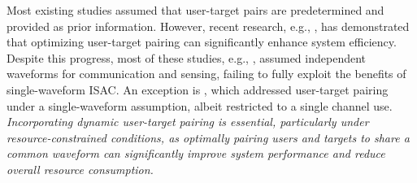 \documentclass[10pt,journal,compsoc]{IEEEtran}
\theoremstyle{myremark}
\theoremstyle{myexample}
\begin{document}
Most existing studies assumed that user-target pairs are predetermined and provided as prior information. However, recent research, e.g., \cite{dou2024:channel-sharing-aided-integrated-sensing-communication-energy-efficient-sensing-scheduling-approach, cazzella2024:deep-learning-based-target-to-user-association-integrated-sensing-communication-systems, abanto2024:optimal-user-target-scheduling-user-target-pairing-low-resolution-phase-only-beamforming-isac-systems}, has demonstrated that optimizing user-target pairing can significantly enhance system efficiency. Despite this progress, most of these studies, e.g., \cite{dou2024:channel-sharing-aided-integrated-sensing-communication-energy-efficient-sensing-scheduling-approach, cazzella2024:deep-learning-based-target-to-user-association-integrated-sensing-communication-systems}, assumed independent waveforms for communication and sensing, failing to fully exploit the benefits of single-waveform \gls{ISAC}. An exception is \cite{abanto2024:optimal-user-target-scheduling-user-target-pairing-low-resolution-phase-only-beamforming-isac-systems}, which addressed user-target pairing under a single-waveform assumption, albeit restricted to a single channel use. \emph{Incorporating dynamic user-target pairing is essential, particularly under resource-constrained conditions, as optimally pairing users and targets to share a common waveform can significantly improve system performance and reduce overall resource consumption.}

 
\end{document}
